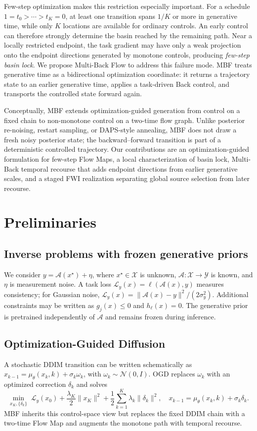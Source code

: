 \documentclass[10pt,twocolumn]{article}
\newcommand{\method}{Multi-Back Flow}
\begin{document}
Few-step optimization makes this restriction especially important. For a schedule $1=t_0>\cdots>t_K=0$, at least one transition spans $1/K$ or more in generative time, while only $K$ locations are available for ordinary controls. An early control can therefore strongly determine the basin reached by the remaining path. Near a locally restricted endpoint, the task gradient may have only a weak projection onto the endpoint directions generated by monotone controls, producing \emph{few-step basin lock}. We propose \method{} to address this failure mode. MBF treats generative time as a bidirectional optimization coordinate: it returns a trajectory state to an earlier generative time, applies a task-driven Back control, and transports the controlled state forward again.

Conceptually, MBF extends optimization-guided generation from control on a fixed chain to non-monotone control on a two-time flow graph. Unlike posterior re-noising, restart sampling, or DAPS-style annealing, MBF does not draw a fresh noisy posterior state; the backward--forward transition is part of a deterministic controlled trajectory. Our contributions are an optimization-guided formulation for few-step Flow Maps, a local characterization of basin lock, Multi-Back temporal recourse that adds endpoint directions from earlier generative scales, and a staged FWI realization separating global source selection from later recourse.

\section{Preliminaries}
\subsection{Inverse problems with frozen generative priors}
We consider $y=\mathcal A(x^\star)+\eta$, where $x^\star\in\mathcal X$ is unknown, $\mathcal A:\mathcal X\to\mathcal Y$ is known, and $\eta$ is measurement noise. A task loss $\mathcal L_y(x)=\ell(\mathcal A(x),y)$ measures consistency; for Gaussian noise, $\mathcal L_y(x)=\|\mathcal A(x)-y\|^2/(2\sigma_y^2)$. Additional constraints may be written as $g_j(x)\le0$ and $h_\ell(x)=0$. The generative prior is pretrained independently of $\mathcal A$ and remains frozen during inference.

\subsection{Optimization-Guided Diffusion}
A stochastic DDIM transition can be written schematically as $x_{k-1}=\mu_\theta(x_k,k)+\sigma_k\omega_k$, with $\omega_k\sim\mathcal N(0,I)$. OGD replaces $\omega_k$ with an optimized correction $\delta_k$ and solves
\begin{equation}
\min_{x_K,\{\delta_k\}}\;\mathcal L_y(x_0)+\frac{\lambda_K}{2}\|x_K\|^2+\frac12\sum_{k=1}^K\lambda_k\|\delta_k\|^2,
\quad x_{k-1}=\mu_\theta(x_k,k)+\sigma_k\delta_k.
\end{equation}
MBF inherits this control-space view but replaces the fixed DDIM chain with a two-time Flow Map and augments the monotone path with temporal recourse.
\end{document}
